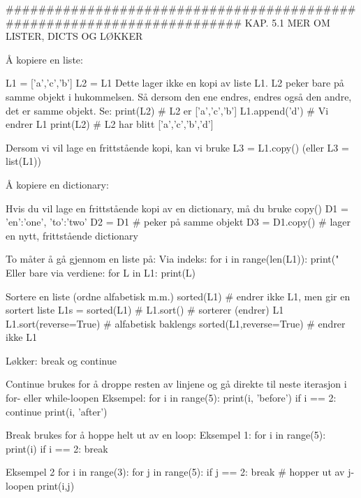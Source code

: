 ######################################################################## 
KAP. 5.1  MER OM LISTER, DICTS OG LØKKER

Å kopiere en liste:

L1 = ['a','c','b']
L2 = L1
Dette lager ikke en kopi av liste L1.
L2 peker bare på samme objekt i hukommelsen.
Så dersom den ene endres, endres også den andre, det er samme objekt.
Se: 
print(L2)       # L2 er ['a','c','b']
L1.append('d')  # Vi endrer L1
print(L2)       # L2 har blitt ['a','c','b','d']

Dersom vi vil lage en frittstående kopi, kan vi bruke 
L3 = L1.copy()
(eller L3 = list(L1))



Å kopiere en dictionary: 

Hvis du vil lage en frittstående kopi av en dictionary, må du bruke copy()
D1 = {'en':'one', 'to':'two'}
D2 = D1           # peker på samme objekt
D3 = D1.copy()    # lager en nytt, frittstående dictionary



To måter å gå gjennom en liste på: 
Via indeks: 
for i in range(len(L1)):
    print("%
Eller bare via verdiene: 
for L in L1:
    print(L) 


Sortere en liste (ordne alfabetisk m.m.)
sorted(L1)               # endrer ikke L1, men gir en sortert liste 
L1s = sorted(L1)         # 
L1.sort()                # sorterer (endrer) L1
L1.sort(reverse=True)    # alfabetisk baklengs
sorted(L1,reverse=True)  # endrer ikke L1



Løkker: break og continue 

Continue brukes for å droppe resten av linjene og gå direkte til neste 
iterasjon i for- eller while-loopen
Eksempel: 
for i in range(5): 
    print(i, 'before')
    if i == 2: continue
    print(i, 'after')

Break brukes for å hoppe helt ut av en loop: 
Eksempel 1: 
for i in range(5): 
    print(i)
    if i == 2: break

Eksempel 2
for i in range(3): 
    for j in range(5): 
         if j == 2: break  # hopper ut av j-loopen
         print(i,j)



